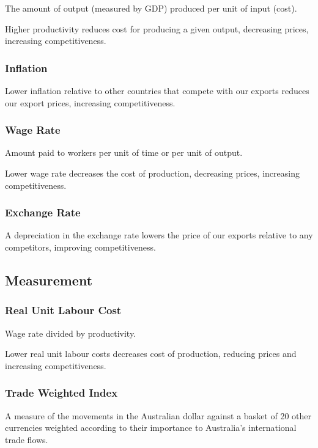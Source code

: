 \documentclass[a4paper,11pt]{article}
\begin{document}
The amount of output (measured by GDP) produced per unit of input (cost).

Higher productivity reduces cost for producing a given output, decreasing
prices, increasing competitiveness.


\subsubsection{Inflation}

Lower inflation relative to other countries that compete with our exports
reduces our export prices, increasing competitiveness.


\subsubsection{Wage Rate}

Amount paid to workers per unit of time or per unit of output.

Lower wage rate decreases the cost of production, decreasing prices, increasing
competitiveness.


\subsubsection{Exchange Rate}

A depreciation in the exchange rate lowers the price of our exports relative to
any competitors, improving competitiveness.


\subsection{Measurement}

\subsubsection{Real Unit Labour Cost}

Wage rate divided by productivity.

Lower real unit labour costs decreases cost of production, reducing prices and
increasing competitiveness.


\subsubsection{Trade Weighted Index}

A measure of the movements in the Australian dollar against a basket of 20
other currencies weighted according to their importance to Australia's
international trade flows.
\end{document}
